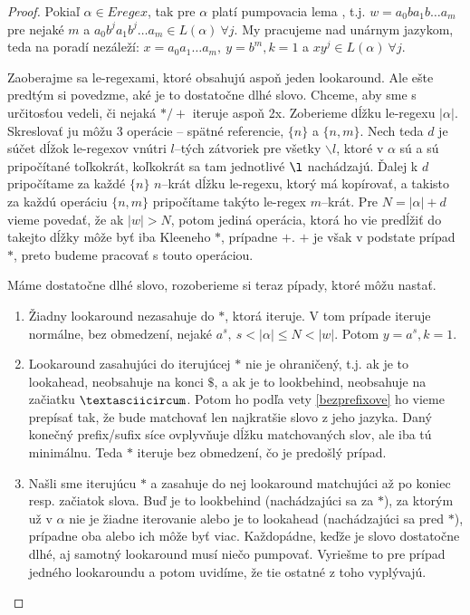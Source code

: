 \begin{proof}
Pokiaľ $\alpha \in Eregex$, tak pre $\alpha$ platí pumpovacia lema \cite[Lemma 1]{ExtendedRegexPower}, t.j. $w = a_0ba_1b\dots a_m$ pre nejaké $m$ a $a_0b^ja_1b^j\dots a_m \in L(\alpha)~\forall j$. My pracujeme nad unárnym jazykom, teda na poradí nezáleží: $x=a_0a_1\dots a_m,~y=b^m, k=1$ a $xy^j \in L(\alpha)~\forall j$.

Zaoberajme sa le-regexami, ktoré obsahujú aspoň jeden lookaround. Ale ešte predtým si povedzme, aké je to dostatočne dlhé slovo. Chceme, aby sme s určitosťou vedeli, či nejaká $*/+$ iteruje aspoň 2x. Zoberieme dĺžku le-regexu $\vert \alpha \vert$. Skreslovať ju môžu 3 ope\-rá\-cie -- spätné referencie, $\lbrace n \rbrace$ a $\lbrace n,m \rbrace$. Nech teda $d$ je súčet dĺžok le-regexov vnútri $l$--tých zátvoriek pre všetky $\backslash l$, ktoré v $\alpha$ sú a sú pripočítané toľkokrát, koľkokrát sa tam jednotlivé $\l$ nachádzajú. Ďalej k $d$ pripočítame za každé $\lbrace n \rbrace$ $n$--krát dĺžku le-regexu, ktorý má kopírovať, a takisto za každú operáciu $\lbrace n,m \rbrace$ pripočítame takýto le-regex $m$--krát. Pre $N = \vert \alpha \vert + d$ vieme povedať, že ak $\vert w \vert > N$, potom jediná operácia, ktorá ho vie predĺžiť do takejto dĺžky môže byť iba Kleeneho $*$, prípadne $+$. $+$ je však v podstate prípad $*$, preto budeme pracovať s touto operáciou.

Máme dostatočne dlhé slovo, rozoberieme si teraz pípady, ktoré môžu nastať. 
\begin{enumerate}
\item Žiadny lookaround nezasahuje do $*$, ktorá iteruje. V tom prípade iteruje normálne, bez obmedzení, nejaké $a^s, ~ s<\vert \alpha \vert \leq N < \vert w \vert$. Potom $y=a^s, k=1$. 
\item Lookaround zasahujúci do iterujúcej $*$ nie je ohraničený, t.j. ak je to lookahead, neobsahuje na konci $\mathdollar$, a ak je to lookbehind, neobsahuje na začiatku $\textasciicircum$. Potom ho podľa vety \ref{bezprefixove} ho vieme prepísať tak, že bude matchovať len najkratšie slovo z jeho jazyka. Daný konečný prefix/sufix síce ovplyvňuje dĺžku matchovaných slov, ale iba tú minimálnu. Teda $*$ iteruje bez obmedzení, čo je predošlý prípad. 
\item Našli sme iterujúcu $*$ a zasahuje do nej lookaround matchujúci až po koniec resp. začiatok slova. Buď je to lookbehind (nachádzajúci sa za $*$), za ktorým už v $\alpha$ nie je žiadne iterovanie alebo je to lookahead (nachádzajúci sa pred $*$), prípadne oba alebo ich môže byť viac. Každopádne, keďže je slovo dostatočne dlhé, aj samotný lookaround musí niečo pumpovať. Vyriešme to pre prípad jedného lookaroundu a potom uvidíme, že tie ostatné z toho vyplývajú.


\end{enumerate}
\end{proof}
